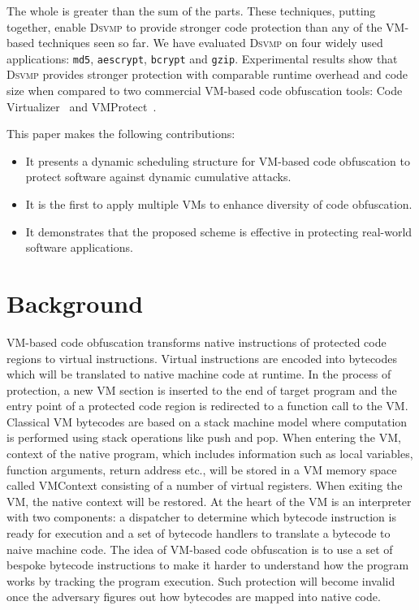 \documentclass[conference]{IEEEtran}
\newcommand{\DSVMP}{\textsc{Dsvmp}\xspace}
\begin{document}
The whole is greater than the sum of the parts. These techniques, putting together,
enable \DSVMP to provide stronger code protection than any of the VM-based techniques seen so far.
We have evaluated \DSVMP on four widely used applications:  \texttt{md5}, \texttt{aescrypt}, \texttt{bcrypt} and \texttt{gzip}. Experimental results show that \DSVMP provides stronger protection with comparable runtime overhead and code size
when compared to two commercial VM-based code obfuscation tools: Code Virtualizer~\cite{2CV} and VMProtect~\cite{3Vmprotect}.


This paper makes the following contributions:
\begin{itemize}
  \item It presents a dynamic scheduling structure for VM-based code obfuscation to protect software against dynamic cumulative attacks.
  \item It is the first to apply multiple VMs to enhance diversity of code obfuscation.
  \item It demonstrates that the proposed scheme is effective in protecting real-world software applications.
\end{itemize}




\section{Background}
VM-based code obfuscation transforms native instructions of protected code
regions to virtual instructions. Virtual instructions are encoded into
bytecodes which will be translated to native machine code at runtime.
In the process of protection, a new VM section is inserted to the end of target program and the
entry point of a protected code region is redirected to a function call to
the VM. Classical VM bytecodes are based on a stack machine model where
computation is performed using stack operations like push and pop.
When entering the VM, context of the native program, which includes information
such as local variables, function arguments, return address etc., will be
stored in a VM memory space called VMContext consisting of a number of
virtual registers. When exiting the VM, the native context will be restored.
At the heart of the VM is an interpreter with two components: a dispatcher to
determine which bytecode instruction is ready for execution and a set of
bytecode handlers to translate a bytecode to naive machine code. The idea of
VM-based code obfuscation is to use a set of bespoke bytecode instructions to
make it harder to understand how the program works by tracking the program execution.
Such protection will become invalid once the adversary figures out how bytecodes are mapped into native code.
\end{document}
